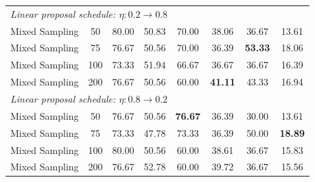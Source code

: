 \begin{table}[htb]
\begin{tabular}{lccccccc}
\midrule
\multicolumn{8}{l}{
\textit{Linear proposal schedule: $\eta:0.2\rightarrow0.8$}
} \\
\quad Mixed Sampling
& 50
& 80.00
& 50.83
& 70.00
& 38.06
& 36.67
& 13.61 \\
\quad Mixed Sampling
& 75
& 76.67
& 50.56
& 70.00
& 36.39
& \textbf{53.33}
& 18.06 \\
\quad Mixed Sampling
& 100
& 73.33
& 51.94
& 66.67
& 36.67
& 36.67
& 16.39 \\
\quad Mixed Sampling
& 200
& 76.67
& 50.56
& 60.00
& \textbf{41.11}
& 43.33
& 16.94 \\

\midrule
\multicolumn{8}{l}{
\textit{Linear proposal schedule: $\eta:0.8\rightarrow0.2$}
} \\
\quad Mixed Sampling
& 50
& 76.67
& 50.56
& \textbf{76.67}
& 36.39
& 30.00
& 13.61 \\
\quad Mixed Sampling
& 75
& 73.33
& 47.78
& 73.33
& 36.39
& 50.00
& \textbf{18.89} \\
\quad Mixed Sampling
& 100
& 80.00
& 50.56
& 60.00
& 38.61
& 36.67
& 15.83 \\
\quad Mixed Sampling
& 200
& 76.67
& 52.78
& 60.00
& 39.72
& 36.67
& 15.56 \\

\bottomrule
\end{tabular}
\end{table}